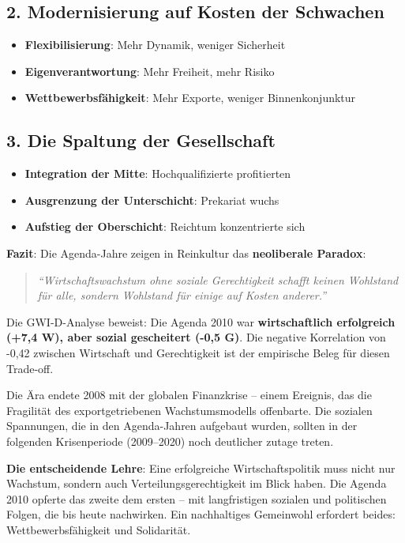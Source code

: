 \subsection{2. Modernisierung auf Kosten der Schwachen}

\begin{itemize}
    \item \textbf{Flexibilisierung}: Mehr Dynamik, weniger Sicherheit
    \item \textbf{Eigenverantwortung}: Mehr Freiheit, mehr Risiko
    \item \textbf{Wettbewerbsfähigkeit}: Mehr Exporte, weniger Binnenkonjunktur
\end{itemize}

\subsection{3. Die Spaltung der Gesellschaft}

\begin{itemize}
    \item \textbf{Integration der Mitte}: Hochqualifizierte profitierten
    \item \textbf{Ausgrenzung der Unterschicht}: Prekariat wuchs
    \item \textbf{Aufstieg der Oberschicht}: Reichtum konzentrierte sich
\end{itemize}

\textbf{Fazit}: Die Agenda-Jahre zeigen in Reinkultur das \textbf{neoliberale Paradox}:

\begin{quote}
    \textit{\enquote{Wirtschaftswachstum ohne soziale Gerechtigkeit schafft keinen Wohlstand für alle, sondern Wohlstand für einige auf Kosten
	anderer.}}
\end{quote}

Die GWI-D-Analyse beweist: Die Agenda 2010 war \textbf{wirtschaftlich erfolgreich (+7,4 W), aber sozial gescheitert (-0,5 G)}. Die negative
Korrelation von -0,42 zwischen Wirtschaft und Gerechtigkeit ist der empirische Beleg für diesen Trade-off.

Die Ära endete 2008 mit der globalen Finanzkrise – einem Ereignis, das die Fragilität des exportgetriebenen Wachstumsmodells offenbarte. Die
sozialen Spannungen, die in den Agenda-Jahren aufgebaut wurden, sollten in der folgenden Krisenperiode (2009–2020) noch deutlicher zutage treten.

\textbf{Die entscheidende Lehre}: Eine erfolgreiche Wirtschaftspolitik muss nicht nur Wachstum, sondern auch Verteilungsgerechtigkeit im Blick haben.
Die Agenda 2010 opferte das zweite dem ersten – mit langfristigen sozialen und politischen Folgen, die bis heute nachwirken. Ein nachhaltiges
Gemeinwohl erfordert beides: Wettbewerbsfähigkeit und Solidarität.

\endinput